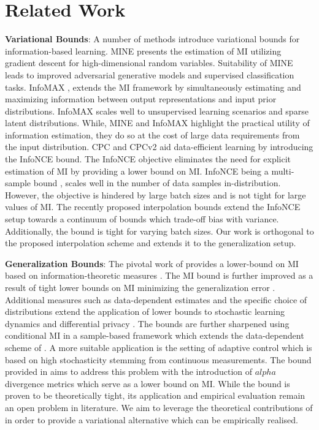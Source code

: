 \documentclass{article}
\begin{document}
\section{Related Work}
\textbf{Variational Bounds}: A number of methods \cite{variational,mine,infomax,cpc,cpcv2} introduce variational bounds for information-based learning. MINE \cite{mine} presents the estimation of MI utilizing gradient descent for high-dimensional random variables. Suitability of MINE leads to improved adversarial generative models and supervised classification tasks. InfoMAX \cite{infomax}, extends the MI framework by simultaneously estimating and maximizing information between output representations and input prior distributions. InfoMAX scales well to unsupervised learning scenarios and sparse latent distributions. While, MINE and InfoMAX highlight the practical utility of information estimation, they do so at the cost of large data requirements from the input distribution. CPC \cite{cpc} and CPCv2 \cite{cpcv2} aid data-efficient learning by introducing the InfoNCE bound. The InfoNCE objective eliminates the need for explicit estimation of MI by providing a lower bound on MI. InfoNCE being a multi-sample bound \cite{variational}, scales well in the number of data samples in-distribution. However, the objective is hindered by large batch sizes and is not tight for large values of MI. The recently proposed interpolation bounds \cite{variational} extend the InfoNCE setup towards a continuum of bounds which trade-off bias with variance. Additionally, the bound is tight for varying batch sizes. Our work is orthogonal to the proposed interpolation scheme and extends it to the generalization setup.  

\textbf{Generalization Bounds}: The pivotal work of \cite{russo} provides a lower-bound on MI based on information-theoretic measures \cite{dv,book}. The MI bound \cite{overfit} is further improved as a result of tight lower bounds on MI minimizing the generalization error \cite{xu,bu}. Additional measures such as data-dependent estimates \cite{negrea} and the specific choice of distributions \cite{kuzborskij} extend the application of lower bounds to stochastic learning dynamics \cite{bu,sgld} and differential privacy \cite{russo,zu}. The bounds are further sharpened using conditional MI \cite{haghifam} in a sample-based framework \cite{steinke} which extends the data-dependent scheme of \cite{negrea}. A more suitable application is the setting of adaptive control \cite{control} which is based on high stochasticity stemming from continuous measurements. The bound provided in \cite{control} aims to address this problem with the introduction of $alpha$ divergence metrics \cite{measures} which serve as a lower bound on MI. While the bound is proven to be theoretically tight, its application and empirical evaluation remain an open problem in literature. We aim to leverage the theoretical contributions of \cite{control} in order to provide a variational alternative which can be empirically realised.
\end{document}
